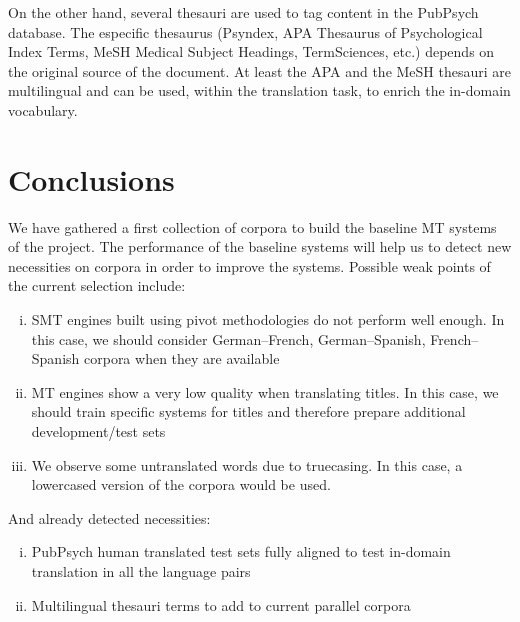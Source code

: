 \documentclass[a4paper,11pt]{article}
\begin{document}
On the other hand, several thesauri are used to tag content in the PubPsych database. The especific thesaurus (Psyndex, APA Thesaurus of Psychological Index Terms, MeSH Medical Subject Headings, TermSciences, etc.) depends on the original source of the document. At least the APA and the MeSH thesauri are multilingual and can be used, within the translation task, to enrich the in-domain vocabulary.



\section{Conclusions}
\label{s:conclusions}

We have gathered a first collection of corpora to build the baseline MT systems of the project. The performance of the baseline systems will help us to detect new necessities on corpora in order to improve the systems. Possible weak points of the current selection include:

\begin{enumerate}[(i)]
\itemsep0em 
 \item SMT engines built using pivot methodologies do not perform well enough. In this case, we should consider German--French, German--Spanish, French--Spanish corpora when they are available
 \item MT engines show a very low quality when translating titles. In this case, we should train specific systems for titles and therefore prepare additional development/test sets
 \item We observe some untranslated words due to truecasing. In this case, a lowercased version of the corpora would be used.
\end{enumerate}

And already detected necessities:
\begin{enumerate}[(i)]
\itemsep0em 
 \item PubPsych human translated test sets fully aligned to test in-domain translation in all the language pairs
 \item Multilingual thesauri terms to add to current parallel corpora
\end{enumerate}


%
%


\end{document}

